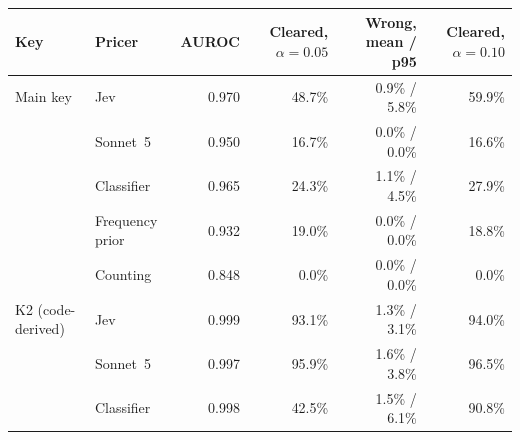 \begin{tabular}{@{}llrrrr@{}}
\toprule
Key & Pricer & AUROC & Cleared, $\alpha{=}0.05$ & Wrong, mean / p95 & Cleared, $\alpha{=}0.10$\\
\midrule
Main key & Jev & 0.970 & 48.7\% & 0.9\% / 5.8\% & 59.9\%\\
 & Sonnet~5 & 0.950 & 16.7\% & 0.0\% / 0.0\% & 16.6\%\\
 & Classifier & 0.965 & 24.3\% & 1.1\% / 4.5\% & 27.9\%\\
 & Frequency prior & 0.932 & 19.0\% & 0.0\% / 0.0\% & 18.8\%\\
 & Counting & 0.848 & 0.0\% & 0.0\% / 0.0\% & 0.0\%\\
\midrule
K2 (code-derived) & Jev & 0.999 & 93.1\% & 1.3\% / 3.1\% & 94.0\%\\
 & Sonnet~5 & 0.997 & 95.9\% & 1.6\% / 3.8\% & 96.5\%\\
 & Classifier & 0.998 & 42.5\% & 1.5\% / 6.1\% & 90.8\%\\
\bottomrule
\end{tabular}
